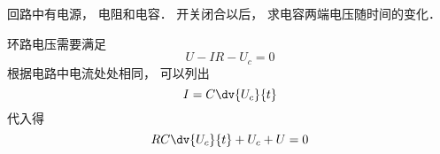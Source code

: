 
回路中有电源， 电阻和电容． 开关闭合以后， 求电容两端电压随时间的变化．

环路电压需要满足
\begin{equation}
U - IR - U_c = 0
\end{equation}
根据电路中电流处处相同， 可以列出
\begin{equation}
I = C\dv{U_c}{t}
\end{equation}
代入得
\begin{equation}
RC\dv{U_c}{t} + U_c + U = 0
\end{equation}
